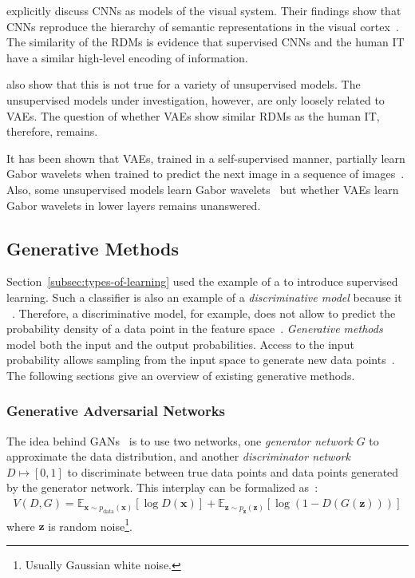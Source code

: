 \citet{eickenberg2017seeing} explicitly discuss \acp{CNN} as models of the visual system.
Their findings show that \acp{CNN} reproduce the hierarchy of semantic representations in the visual cortex~\citep{eickenberg2017seeing, wen2018neural}.
The similarity of the \acp{RDM} is evidence that supervised \acp{CNN} and the human \ac{IT} have a similar high-level encoding of information.

\citet{khaligh2014deep} also show that this is not true for a variety of unsupervised models.
The unsupervised models under investigation, however, are only loosely related to \acfp{VAE}.
The question of whether \acp{VAE} show similar \acp{RDM} as the human \ac{IT}, therefore, remains.

It has been shown that \acp{VAE}, trained in a self-supervised manner, partially learn Gabor wavelets when trained to predict the next image in a sequence of images~\citep{palm2012prediction}.
Also, some unsupervised models learn Gabor wavelets~\citep{Olshausen1996,berkes2005slow} but whether \acp{VAE} learn Gabor wavelets in lower layers remains unanswered.

\subsection{Generative Methods}\label{subsec:generative-methods}

Section~\ref{subsec:types-of-learning} used the example of a  to introduce supervised learning.
Such a classifier is also an example of a \textit{discriminative model} because it ~\citep[p. 43]{bishop2006pattern}.
Therefore, a discriminative model, for example, does not allow to predict the probability density of a data point in the feature space~\citep[pp. 43,44]{bishop2006pattern}.
\textit{Generative methods} model both the input and the output probabilities.
Access to the input probability allows sampling from the input space to generate new data points~\citep[p. 43]{bishop2006pattern}.
The following sections give an overview of existing generative methods.

\subsubsection{Generative Adversarial Networks}\label{subsubsec:gans}

The idea behind \acp{GAN}~\citep{goodfellow2014gans} is to use two networks, one \textit{generator network} $G$ to approximate the data distribution, and another \textit{discriminator network} $D \mapsto [0, 1]$ to discriminate between true data points and data points generated by the generator network.
This interplay can be formalized as~\citep{goodfellow2014gans}:
\begin{align}
    V(D, G)=\mathbb{E}_{\bm{x} \sim p_{\text{data}}(\bm{x})}[\log D(\bm{x})]+\mathbb{E}_{\bm{z} \sim p_{\bm{z}}(\bm{z})}[\log (1-D(G(\bm{z})))]
\end{align}
where $\bm{z}$ is random noise\footnote{Usually Gaussian white noise.}.

